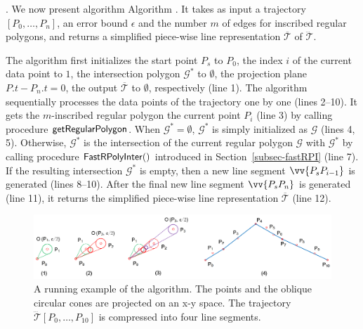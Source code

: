 . We now present algorithm Algorithm \cist. It takes as input a trajectory ${[P_0, \ldots, P_n]}$, an error bound $\epsilon$ and the number $m$ of edges for inscribed regular polygons, and returns a simplified  piece-wise line representation $\overline{\mathcal{T}}$ of $\dddot{\mathcal{T}}$.



The algorithm first initializes the start point $P_s$ to $P_0$, the index $i$ of the current data point to $1$, the intersection polygon $\mathcal{G}^*$ to $\emptyset$, the projection plane $P.t - P_n.t = 0$, the output $\overline{\mathcal{T}}$ to $\emptyset$, respectively (line 1).
%
The algorithm sequentially processes the data points of the trajectory one by one  (lines 2--10). It gets the $m$-inscribed regular polygon \wrt the current point $P_i$ (line 3) by calling procedure ${\mathsf{getRegularPolygon}}$. When $\mathcal{G}^* = \emptyset$, $\mathcal{G}^*$ is simply initialized as $\mathcal{G}$ (lines 4, 5). Otherwise,
$\mathcal{G}^*$ is  the intersection of the current regular polygon $\mathcal{G}$ with $\mathcal{G}^*$ by calling procedure ${\mathsf{FastRPolyInter}}()$ introduced in Section~\ref{subsec-fastRPI} (line 7). If the resulting intersection $\mathcal{G}^*$ is empty, then a new line segment $\vv{P_sP_{i-1}}$ is generated (lines 8--10).
After the  final new line segment $\vv{P_sP_{n}}$ is generated (line 11), it returns the simplified  piece-wise line representation $\overline{\mathcal{T}}$ (line 12).




\begin{figure}[tb!]
\centering
\includegraphics[scale=0.8]{figures/Fig-ex-conest.png}
\vspace{-2ex}
\caption{\small A running example of the \cist algorithm. The points and the oblique circular cones are projected on an x-y space. The trajectory $\dddot{\mathcal{T}}[P_0, \ldots, P_{10}]$ is compressed into four line segments.}
\vspace{-3ex}
\label{fig:exm-const}
\end{figure}

